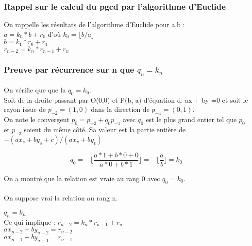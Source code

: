 \subsubsection{Rappel sur le calcul du pgcd par l'algorithme d'Euclide}


On rappelle les résultats de l'algorithme d'Euclide pour a,b : \\
\noindent $a       = k_0*b       + r_0$ d'où $k_0 = \lfloor b / a \rfloor$\\
\noindent $b       = k_1*r_0     + r_1$\\
\noindent $r_{n-2} = k_n*r_{n-1} + r_{n}$\\

\subsubsection{Preuve par récurrence sur n que $q_n = k_n$}

\paragraph{}

On vérifie que que la $q_0 = k_0$.\\

Soit de la droite passant par O(0,0) et P(b, a) d'équation d: ax + by =0 et soit le rayon issue de $p_{-2} = (1,0)$ dans la direction de $p_{-1} = (0,1)$.\\

On note le convergent $p_{0} = p_{-2} + q_0 p_{-1}$ avec $q_0$ est le plus grand entier tel que $p_0$ et $p_{-2}$ soient du même côté. Sa valeur est la partie entière de $-(a x_s + b y_s +c)/(a x_v + b y_v)$

$$q_0 = - \lfloor\frac{a*1 + b*0 +0}{a*0 + b*1}\rfloor = - \lfloor\frac{a}{b}\rfloor = k_0$$

On a montré que la relation est vraie au rang 0 avec \textbf{$q_0 = k_0$}.

\paragraph{}
On suppose vrai la relation au rang n.

$q_n = k_n$\\

Ce qui implique :  
$r_{n-2} = k_n*r_{n-1} + r_{n}$\\
$a x_{n-2} + b y_{n-2} = r_{n-2}$\\
$a x_{n-1} + b y_{n-1} = r_{n-1}$\\

